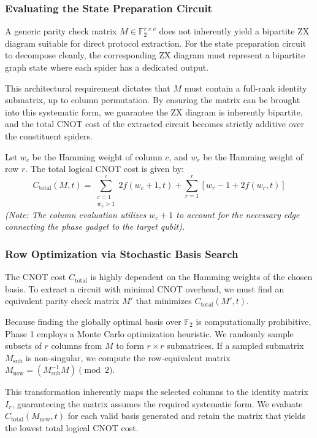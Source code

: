 \documentclass[11pt]{article}
\theoremstyle{definition}
\begin{document}
\subsubsection*{Evaluating the State Preparation Circuit}
A generic parity check matrix $M \in \mathbb{F}_2^{r \times c}$ does not inherently yield a bipartite ZX diagram suitable for direct protocol extraction. For the state preparation circuit to decompose cleanly, the corresponding ZX diagram must represent a bipartite graph state where each spider has a dedicated output.

This architectural requirement dictates that $M$ must contain a full-rank identity submatrix, up to column permutation. By ensuring the matrix can be brought into this systematic form, we guarantee the ZX diagram is inherently bipartite, and the total CNOT cost of the extracted circuit becomes strictly additive over the constituent spiders.

Let $w_c$ be the Hamming weight of column $c$, and $w_r$ be the Hamming weight of row $r$. The total logical CNOT cost is given by:
\begin{equation}
C_{\text{total}}(M, t) = \sum_{\substack{c=1 \\ w_c > 1}}^c 2f(w_c + 1, t) + \sum_{r=1}^r \left[ w_r - 1 + 2f(w_r, t) \right]
\end{equation}
\textit{(Note: The column evaluation utilizes $w_c + 1$ to account for the necessary edge connecting the phase gadget to the target qubit).}

\subsubsection*{Row Optimization via Stochastic Basis Search}
The CNOT cost $C_{\text{total}}$ is highly dependent on the Hamming weights of the chosen basis. To extract a circuit with minimal CNOT overhead, we must find an equivalent parity check matrix $M'$ that minimizes $C_{\text{total}}(M', t)$.

Because finding the globally optimal basis over $\mathbb{F}_2$ is computationally prohibitive, Phase 1 employs a Monte Carlo optimization heuristic. We randomly sample subsets of $r$ columns from $M$ to form $r \times r$ submatrices. If a sampled submatrix $M_{\text{sub}}$ is non-singular, we compute the row-equivalent matrix $M_{\text{new}} = (M_{\text{sub}}^{-1} M) \pmod 2$.

This transformation inherently maps the selected columns to the identity matrix $I_r$, guaranteeing the matrix assumes the required systematic form. We evaluate $C_{\text{total}}(M_{\text{new}}, t)$ for each valid basis generated and retain the matrix that yields the lowest total logical CNOT cost.
\end{document}
